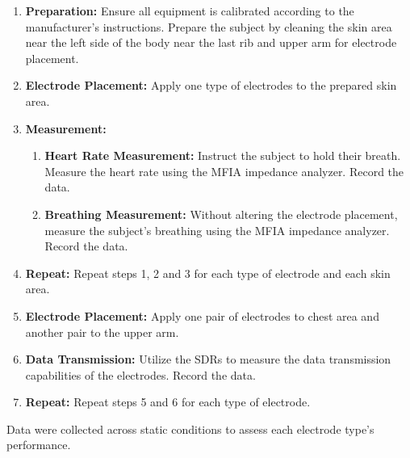 \documentclass[conference]{IEEEtran}
\newcommand{\notea}[1]{\textcolor{blue}{Armands: #1}}
\begin{document}
\begin{enumerate}
    \item \textbf{Preparation:} Ensure all equipment is calibrated according to the manufacturer's instructions. Prepare the subject by cleaning the skin area near the left side of the body near the last rib and upper arm for electrode placement.
    \item \textbf{Electrode Placement:} Apply one type of electrodes to the prepared skin area.
    \item \textbf{Measurement:}
    \begin{enumerate}
        \item \textbf{Heart Rate Measurement:} Instruct the subject to hold their breath. Measure the heart rate using the MFIA impedance analyzer. Record the data.
        \item \textbf{Breathing Measurement:} Without altering the electrode placement, measure the subject's breathing using the MFIA impedance analyzer. Record the data.
        
    \end{enumerate}

    \item \textbf{Repeat:} Repeat steps 1, 2 and 3 for each type of electrode and each skin area.
    \item \textbf{Electrode Placement:} Apply one pair of electrodes to chest area and another pair to the upper arm.
    \item \textbf{Data Transmission:} Utilize the SDRs to measure the data transmission capabilities of the electrodes. Record the data.
    \item \textbf{Repeat:} Repeat steps 5 and 6 for each type of electrode.
\end{enumerate}

Data were collected across static conditions to assess each electrode type's performance.




    
\end{document}
